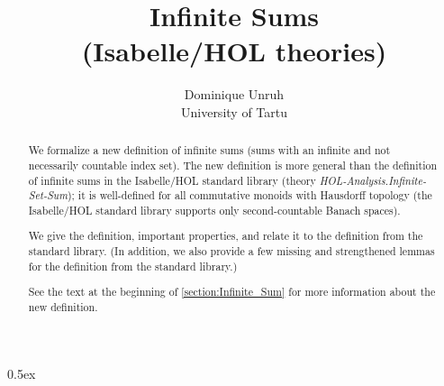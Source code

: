 \documentclass[11pt,a4paper]{article}
\begin{document}
\title{Infinite Sums\\[5pt]\normalsize (Isabelle/HOL theories)}
\author{Dominique Unruh\\\small University of Tartu}

\maketitle

\begin{abstract}
  We formalize a new definition of infinite sums (sums with an infinite and not necessarily countable index set).
  The new definition is more general than the definition of infinite sums in the Isabelle/HOL standard library (theory \textit{HOL-Analysis.Infinite-Set-Sum});
  it is well-defined for all commutative monoids with Hausdorff topology
  (the Isabelle/HOL standard library supports only second-countable Banach spaces).

  We give the definition, important properties, and relate it to the definition from the standard library.
  (In addition, we also provide a few missing and strengthened lemmas for the definition from the standard library.)

  See the text at the beginning of \autoref{section:Infinite_Sum} for more information about the new definition.
\end{abstract}


\tableofcontents

\parindent 0pt\parskip 0.5ex





\end{document}
